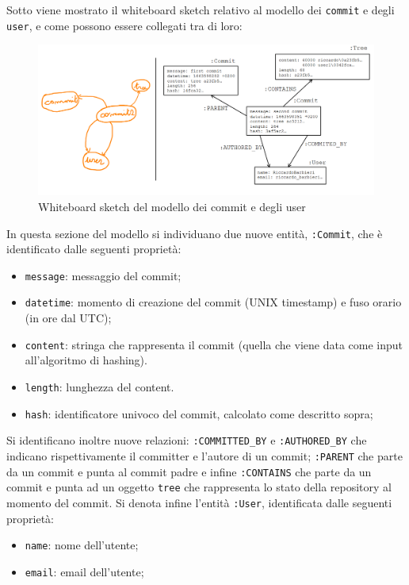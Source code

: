 Sotto viene mostrato il whiteboard sketch relativo al modello dei \texttt{commit} e degli \texttt{user}, e come possono essere collegati tra di loro:
\begin{figure}[H]
    \centering
    \includegraphics[width=15cm]{./immagini/whiteboard_commit.png}
    \caption{Whiteboard sketch del modello dei commit e degli user}
\end{figure}
In questa sezione del modello si individuano due nuove entità, \texttt{:Commit}, che è identificato dalle seguenti proprietà:
\begin{itemize}
    \item \texttt{message}: messaggio del commit;
    \item \texttt{datetime}: momento di creazione del commit (UNIX timestamp) e fuso orario (in ore dal UTC);
    \item \texttt{content}: stringa che rappresenta il commit (quella che viene data come input all'algoritmo di hashing).
    \item \texttt{length}: lunghezza del content.
    \item \texttt{hash}: identificatore univoco del commit, calcolato come descritto sopra;
\end{itemize}
Si identificano inoltre nuove relazioni: \texttt{:COMMITTED\_BY} e \texttt{:AUTHORED\_BY} che indicano rispettivamente il committer e l'autore di un commit; \texttt{:PARENT} che parte da un commit e punta al commit padre e infine \texttt{:CONTAINS} che parte da un commit e punta ad un oggetto \texttt{tree} che rappresenta lo stato della repository al momento del commit.
Si denota infine l'entità \texttt{:User}, identificata dalle seguenti proprietà:
\begin{itemize}
    \item \texttt{name}: nome dell'utente;
    \item \texttt{email}: email dell'utente;
\end{itemize}

